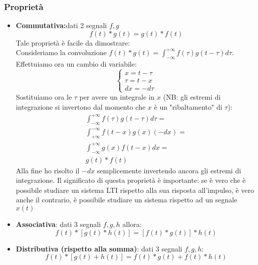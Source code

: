 \subsubsection{Proprietà}
\begin{itemize}
    \item \textbf{Commutativa:}dati 2 segnali $f,g$
    \begin{equation} \label{prop: convComm}
        f(t) \ast g(t) = g(t) \ast f(t)
    \end{equation}
    Tale proprietà è facile da dimostrare:\\
    Consideriamo la convoluzione $f(t) \ast g(t) = \int_{-\infty}^{+\infty} f(\tau)g(t - \tau) d\tau$. Effettuiamo ora un cambio di variabile:
    \begin{equation*}
        \begin{cases}
            x = t - \tau\\
            \tau = t - x\\
            dx = -d\tau
        \end{cases}
    \end{equation*}
    Sostituiamo ora le $\tau$ per avere un integrale in $x$ (NB: gli estremi di integrazione si invertono dal momento che $x$ è un "ribaltamento" di $\tau$):
    \begin{align*}
        \int_{-\infty}^{+\infty} f(\tau)g(t - \tau) d\tau= \\
        \int_{+\infty}^{-\infty} f(t - x)g(x) (-dx) = \\
        \int_{-\infty}^{+\infty} g(x)f(t - x) dx = \\
        g(t) \ast f(t)
    \end{align*}
    Alla fine ho risolto il $-dx$ semplicemente invertendo ancora gli estremi di integrazione. Il significato di questa proprietà è importante:
    se è vero che è possibile studiare un sistema LTI rispetto alla sua risposta all'impulso, è vero anche il contrario, è possibile studiare un sistema rispetto ad un segnale $x(t)$
    \item \textbf{Associativa}: dati 3 segnali $f,g,h$ allora:
    \begin{equation}
        f(t) \ast [g(t) \ast h(t)] = [f(t) \ast g(t)] \ast h(t)
    \end{equation}

    \item \textbf{Distributiva (rispetto alla somma)}: dati 3 segnali $f,g,h$:
    \begin{equation}
        f(t) \ast [g(t) + h(t)] = f(t) \ast g(t) + f(t) \ast h(t) 
    \end{equation}


\end{itemize}
